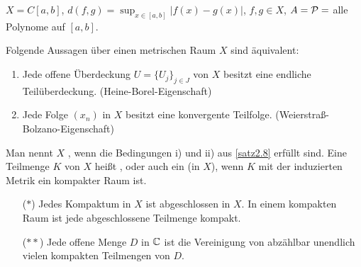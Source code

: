 \begin{beispiel*} $ X=C[a,b] $, $ d(f,g)=\sup_{x\in[a,b]} |f(x)-g(x)| $, $ f,g\in X $, $ A=\mathcal P= $ alle Polynome auf $ [a,b] $. 
\end{beispiel*}
\begin{satz}[\"Aquivalenzsatz]
Folgende Aussagen \"uber einen metrischen Raum $ X $ sind \"aquivalent:
\begin{enumerate}
\item Jede offene \"Uberdeckung $ U=\lbrace U_j\rbrace_{j\in J} $ von $ X $ besitzt eine endliche Teil\"uberdeckung. (Heine-Borel-Eigenschaft)
\item Jede Folge $ (x_n) $ in $ X $ besitzt eine konvergente Teilfolge. (Weierstra\ss-Bolzano-Eigenschaft)
\end{enumerate}
\end{satz}
\begin{definition}
Man nennt $ X $ , wenn die Bedingungen i) und ii) aus \ref{satz2.8} erf\"ullt sind. Eine Teilmenge $ K $ von $ X $ hei\ss t , oder auch ein  (in $ X $), wenn $ K $ mit der induzierten Metrik ein kompakter Raum ist. 
\end{definition}
\begin{enumerate}
\item[($ \ast $)] Jedes Kompaktum in $ X $ ist abgeschlossen in $ X $. In einem kompakten Raum ist jede abgeschlossene Teilmenge kompakt.
\item[($ \ast\ast $)] Jede offene Menge $ D $ in $ \mathbb{C} $ ist die Vereinigung von abz\"ahlbar unendlich vielen kompakten Teilmengen von $ D $.
\end{enumerate}